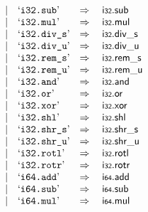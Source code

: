 $$\begin{array}[t]{@{}lrrl@{}l@{}l@{}l@{}}
& & | & \mbox{‘\texttt{i32.sub}’} & \quad\Rightarrow\quad{} & \mathsf{i{\scriptstyle 32}} {.} \mathsf{sub} \\
& & | & \mbox{‘\texttt{i32.mul}’} & \quad\Rightarrow\quad{} & \mathsf{i{\scriptstyle 32}} {.} \mathsf{mul} \\
& & | & \mbox{‘\texttt{i32.div\_s}’} & \quad\Rightarrow\quad{} & \mathsf{i{\scriptstyle 32}} {.} {\mathsf{div}}{\mathsf{\_}}{\mathsf{s}} \\
& & | & \mbox{‘\texttt{i32.div\_u}’} & \quad\Rightarrow\quad{} & \mathsf{i{\scriptstyle 32}} {.} {\mathsf{div}}{\mathsf{\_}}{\mathsf{u}} \\
& & | & \mbox{‘\texttt{i32.rem\_s}’} & \quad\Rightarrow\quad{} & \mathsf{i{\scriptstyle 32}} {.} {\mathsf{rem}}{\mathsf{\_}}{\mathsf{s}} \\
& & | & \mbox{‘\texttt{i32.rem\_u}’} & \quad\Rightarrow\quad{} & \mathsf{i{\scriptstyle 32}} {.} {\mathsf{rem}}{\mathsf{\_}}{\mathsf{u}} \\
& & | & \mbox{‘\texttt{i32.and}’} & \quad\Rightarrow\quad{} & \mathsf{i{\scriptstyle 32}} {.} \mathsf{and} \\
& & | & \mbox{‘\texttt{i32.or}’} & \quad\Rightarrow\quad{} & \mathsf{i{\scriptstyle 32}} {.} \mathsf{or} \\
& & | & \mbox{‘\texttt{i32.xor}’} & \quad\Rightarrow\quad{} & \mathsf{i{\scriptstyle 32}} {.} \mathsf{xor} \\
& & | & \mbox{‘\texttt{i32.shl}’} & \quad\Rightarrow\quad{} & \mathsf{i{\scriptstyle 32}} {.} \mathsf{shl} \\
& & | & \mbox{‘\texttt{i32.shr\_s}’} & \quad\Rightarrow\quad{} & \mathsf{i{\scriptstyle 32}} {.} {\mathsf{shr}}{\mathsf{\_}}{\mathsf{s}} \\
& & | & \mbox{‘\texttt{i32.shr\_u}’} & \quad\Rightarrow\quad{} & \mathsf{i{\scriptstyle 32}} {.} {\mathsf{shr}}{\mathsf{\_}}{\mathsf{u}} \\
& & | & \mbox{‘\texttt{i32.rotl}’} & \quad\Rightarrow\quad{} & \mathsf{i{\scriptstyle 32}} {.} \mathsf{rotl} \\
& & | & \mbox{‘\texttt{i32.rotr}’} & \quad\Rightarrow\quad{} & \mathsf{i{\scriptstyle 32}} {.} \mathsf{rotr} \\
& & | & \mbox{‘\texttt{i64.add}’} & \quad\Rightarrow\quad{} & \mathsf{i{\scriptstyle 64}} {.} \mathsf{add} \\
& & | & \mbox{‘\texttt{i64.sub}’} & \quad\Rightarrow\quad{} & \mathsf{i{\scriptstyle 64}} {.} \mathsf{sub} \\
& & | & \mbox{‘\texttt{i64.mul}’} & \quad\Rightarrow\quad{} & \mathsf{i{\scriptstyle 64}} {.} \mathsf{mul} \\

\end{array}$$
